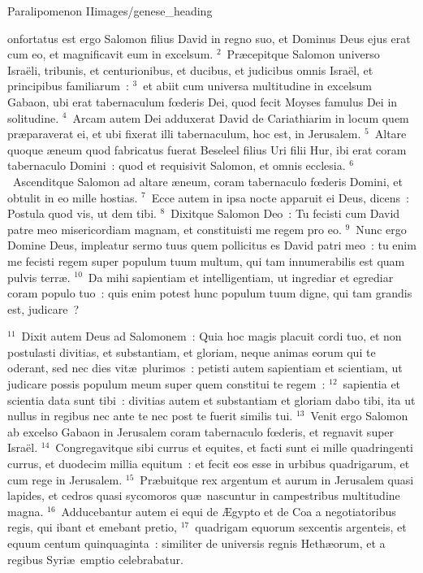{Paralipomenon II}{images/genese_heading}


\bchapter
{}onfortatus est ergo Salomon filius David in regno suo, et Dominus Deus ejus erat cum eo, et magnificavit eum in excelsum.
${}^{2}$~Pr\ae cepitque Salomon universo Isra\"eli, tribunis, et centurionibus, et ducibus, et judicibus omnis Isra\"el, et principibus familiarum~:
${}^{3}$~et abiit cum universa multitudine in excelsum Gabaon, ubi erat tabernaculum fœderis Dei, quod fecit Moyses famulus Dei in solitudine.
${}^{4}$~Arcam autem Dei adduxerat David de Cariathiarim in locum quem pr\ae paraverat ei, et ubi fixerat illi tabernaculum, hoc est, in Jerusalem.
${}^{5}$~Altare quoque \ae neum quod fabricatus fuerat Beseleel filius Uri filii Hur, ibi erat coram tabernaculo Domini~: quod et requisivit Salomon, et omnis ecclesia.
${}^{6}$~Ascenditque Salomon ad altare \ae neum, coram tabernaculo fœderis Domini, et obtulit in eo mille hostias.
${}^{7}$~Ecce autem in ipsa nocte apparuit ei Deus, dicens~: Postula quod vis, ut dem tibi.
${}^{8}$~Dixitque Salomon Deo~: Tu fecisti cum David patre meo misericordiam magnam, et constituisti me regem pro eo.
${}^{9}$~Nunc ergo Domine Deus, impleatur sermo tuus quem pollicitus es David patri meo~: tu enim me fecisti regem super populum tuum multum, qui tam innumerabilis est quam pulvis terr\ae .
${}^{10}$~Da mihi sapientiam et intelligentiam, ut ingrediar et egrediar coram populo tuo~: quis enim potest hunc populum tuum digne, qui tam grandis est, judicare~?


${}^{11}$~Dixit autem Deus ad Salomonem~: Quia hoc magis placuit cordi tuo, et non postulasti divitias, et substantiam, et gloriam, neque animas eorum qui te oderant, sed nec dies vit\ae\ plurimos~: petisti autem sapientiam et scientiam, ut judicare possis populum meum super quem constitui te regem~:
${}^{12}$~sapientia et scientia data sunt tibi~: divitias autem et substantiam et gloriam dabo tibi, ita ut nullus in regibus nec ante te nec post te fuerit similis tui.
${}^{13}$~Venit ergo Salomon ab excelso Gabaon in Jerusalem coram tabernaculo fœderis, et regnavit super Isra\"el.
${}^{14}$~Congregavitque sibi currus et equites, et facti sunt ei mille quadringenti currus, et duodecim millia equitum~: et fecit eos esse in urbibus quadrigarum, et cum rege in Jerusalem.
${}^{15}$~Pr\ae buitque rex argentum et aurum in Jerusalem quasi lapides, et cedros quasi sycomoros qu\ae\ nascuntur in campestribus multitudine magna.
${}^{16}$~Adducebantur autem ei equi de \AE gypto et de Coa a negotiatoribus regis, qui ibant et emebant pretio,
${}^{17}$~quadrigam equorum sexcentis argenteis, et equum centum quinquaginta~: similiter de universis regnis Heth\ae orum, et a regibus Syri\ae\ emptio celebrabatur.

